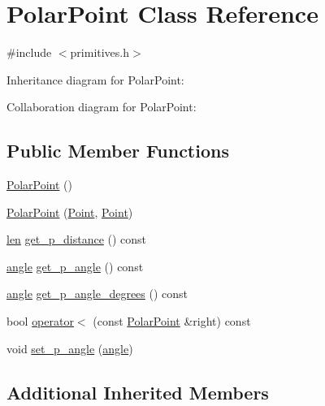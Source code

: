\hypertarget{class_polar_point}{}\section{Polar\+Point Class Reference}
\label{class_polar_point}


{\ttfamily \#include $<$primitives.\+h$>$}



Inheritance diagram for Polar\+Point\+:


Collaboration diagram for Polar\+Point\+:
\subsection*{Public Member Functions}
\begin{DoxyCompactItemize}
\item 
\mbox{\hyperlink{class_polar_point_aa5dc669fa33f48c9dccd235751cb8db5}{Polar\+Point}} ()
\item 
\mbox{\hyperlink{class_polar_point_a85656b69c29c9f60781dd734926863b6}{Polar\+Point}} (\mbox{\hyperlink{class_point}{Point}}, \mbox{\hyperlink{class_point}{Point}})
\item 
\mbox{\hyperlink{primitives_8h_a0daa439ba651ea0fd8d02392244db601}{len}} \mbox{\hyperlink{class_polar_point_afb68d253c45fe88bc49fafcf81ec2276}{get\+\_\+p\+\_\+distance}} () const
\item 
\mbox{\hyperlink{primitives_8h_a41ee332ff1a31807cb838b616c186dd7}{angle}} \mbox{\hyperlink{class_polar_point_a5918f355697069f0e54e924673c7a872}{get\+\_\+p\+\_\+angle}} () const
\item 
\mbox{\hyperlink{primitives_8h_a41ee332ff1a31807cb838b616c186dd7}{angle}} \mbox{\hyperlink{class_polar_point_a32537087535c21aee75a7799c168645d}{get\+\_\+p\+\_\+angle\+\_\+degrees}} () const
\item 
bool \mbox{\hyperlink{class_polar_point_a705e9afe8f23c0cac34b25a006c574e8}{operator$<$}} (const \mbox{\hyperlink{class_polar_point}{Polar\+Point}} \&right) const
\item 
void \mbox{\hyperlink{class_polar_point_ac63f2017507c73c4bd3c5f89994627ef}{set\+\_\+p\+\_\+angle}} (\mbox{\hyperlink{primitives_8h_a41ee332ff1a31807cb838b616c186dd7}{angle}})
\end{DoxyCompactItemize}
\subsection*{Additional Inherited Members}


